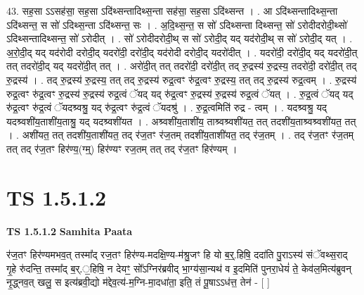 \documentclass[17pt]{extarticle}
\begin{document}
43. सह॒सा ऽऽसह॑सा॒ सह॒सा ऽदि॑थ्सन्तादिथ्स॒न्ता सह॑सा॒ सह॒सा ऽदि॑थ्सन्त । . आ ऽदि॑थ्सन्तादिथ्स॒न्ता ऽदि॑थ्सन्त॒ स सो॑ ऽदिथ्स॒न्ता ऽदि॑थ्सन्त॒ सः । . अ॒दि॒थ्स॒न्त॒ स सो॑ ऽदिथ्सन्ता दिथ्सन्त॒ सो॑ ऽरोदीदरोदी॒थ्सो॑ ऽदिथ्सन्तादिथ्सन्त॒ सो॑ ऽरोदीत् । . सो॑ ऽरोदीदरोदी॒थ् स सो॑ ऽरोदी॒द् यद् यद॑रोदी॒थ् स सो॑ ऽरोदी॒द् यत् । . अ॒रो॒दी॒द् यद् यद॑रोदी दरोदी॒द् यदरो॑दी॒ दरो॑दी॒द् यद॑रोदी दरोदी॒द् यदरो॑दीत् । . यदरो॑दी॒ दरो॑दी॒द् यद् यदरो॑दी॒त् तत् तदरो॑दी॒द् यद् यदरो॑दी॒त् तत् । . अरो॑दी॒त् तत् तदरो॑दी॒ दरो॑दी॒त् तद् रु॒द्रस्य॑ रु॒द्रस्य॒ तदरो॑दी॒ दरो॑दी॒त् तद् रु॒द्रस्य॑ । . तद् रु॒द्रस्य॑ रु॒द्रस्य॒ तत् तद् रु॒द्रस्य॑ रुद्र॒त्वꣳ रु॑द्र॒त्वꣳ रु॒द्रस्य॒ तत् तद् रु॒द्रस्य॑ रुद्र॒त्वम् । . रु॒द्रस्य॑ रुद्र॒त्वꣳ रु॑द्र॒त्वꣳ रु॒द्रस्य॑ रु॒द्रस्य॑ रुद्र॒त्वं ॅयद् यद् रु॑द्र॒त्वꣳ रु॒द्रस्य॑ रु॒द्रस्य॑ रुद्र॒त्वं ॅयत् । . रु॒द्र॒त्वं ॅयद् यद् रु॑द्र॒त्वꣳ रु॑द्र॒त्वं ॅयदश्र्वश्रु॒ यद् रु॑द्र॒त्वꣳ रु॑द्र॒त्वं ॅयदश्रु॑ । . रु॒द्र॒त्वमिति॑ रुद्र - त्वम् । . यदश्र्वश्रु॒ यद् यदश्र्वशी॑य॒ताशी॑य॒ताश्रु॒ यद् यदश्र्वशी॑यत । . अश्र्वशी॑य॒ताशी॑य॒ ताश्र्वश्र्वशी॑यत॒ तत् तदशी॑य॒ताश्र्वश्र्वशी॑यत॒ तत् । . अशी॑यत॒ तत् तदशी॑य॒ताशी॑यत॒ तद् र॑ज॒तꣳ र॑ज॒तम् तदशी॑य॒ताशी॑यत॒ तद् र॑ज॒तम् । . तद् र॑ज॒तꣳ र॑ज॒तम् तत् तद् र॑ज॒तꣳ हिर॑ण्य॒(ग्म्॒) हिर॑ण्यꣳ रज॒तम् तत् तद् र॑ज॒तꣳ हिर॑ण्यम् । \newline
\pagebreak
{}

\section{ TS 1.5.1.2 }

\textbf{TS 1.5.1.2 } \newline
\textbf{Samhita Paata} \newline

र॑ज॒तꣳ हिर॑ण्यमभव॒त् तस्मा᳚द् रज॒तꣳ हिर॑ण्य-मदक्षि॒ण्य-म॑श्रु॒जꣳ हि यो ब॒र्॒.हिषि॒ ददा॑ति पु॒राऽस्य॑ संॅवथ्स॒राद् गृ॒हे रु॑दन्ति॒ तस्मा᳚द् ब॒र्.॒हिषि॒ न देयꣳ॒॒ सो᳚ऽग्निर॑ब्रवीद् भा॒ग्य॑सा॒न्यथ॑ व इ॒दमिति॑ पुनरा॒धेयं॑ ते॒ केव॑ल॒मित्य॑ब्रुवन् नृ॒द्ध्नव॒त् खलु॒ स इत्य॑ब्रवी॒द्यो म॑द्देव॒त्य॑-म॒ग्नि-मा॒दधा॑ता॒ इति॒ तं पू॒षाऽऽध॑त्त॒ तेन॑ - [ ] \newline
\end{document}
